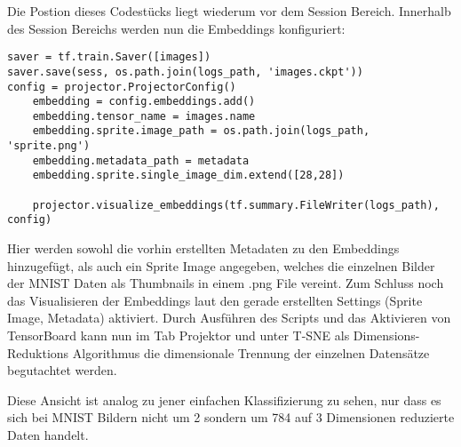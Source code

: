 Die Postion dieses Codestücks liegt wiederum vor dem Session Bereich. Innerhalb des Session Bereichs werden nun die Embeddings konfiguriert:

\lstset{language=Python}

\begin{lstlisting}
saver = tf.train.Saver([images])
saver.save(sess, os.path.join(logs_path, 'images.ckpt'))
config = projector.ProjectorConfig()
    embedding = config.embeddings.add()
    embedding.tensor_name = images.name
    embedding.sprite.image_path = os.path.join(logs_path, 'sprite.png')
    embedding.metadata_path = metadata
    embedding.sprite.single_image_dim.extend([28,28])

    projector.visualize_embeddings(tf.summary.FileWriter(logs_path), config)
\end{lstlisting}



Hier werden sowohl die vorhin erstellten Metadaten zu den Embeddings hinzugefügt, als auch ein Sprite Image angegeben, welches die einzelnen Bilder der MNIST Daten als Thumbnails in einem .png File vereint. Zum Schluss noch das Visualisieren der Embeddings laut den gerade erstellten Settings (Sprite Image, Metadata) aktiviert. Durch Ausführen des Scripts und das Aktivieren von TensorBoard kann nun im Tab Projektor und unter T-SNE als Dimensions-Reduktions Algorithmus die dimensionale Trennung der einzelnen Datensätze begutachtet werden.

Diese Ansicht ist analog zu jener einfachen Klassifizierung zu sehen, nur dass es sich bei MNIST Bildern nicht um 2 sondern um 784 auf 3 Dimensionen reduzierte Daten handelt.


\label{cha:Evaluieren und Visualisieren}